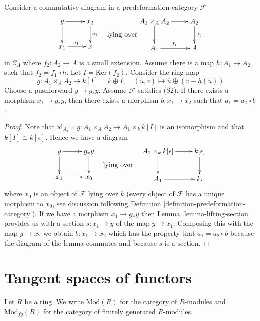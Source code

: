 \begin{lemma}
\label{lemma-lifting-along-small-extension}
Consider a commutative diagram in a predeformation category $\mathcal{F}$
$$
\vcenter{
\xymatrix{
y \ar[r] \ar[d] & x_2 \ar[d]^{a_2} \\
x_1 \ar[r]^{a_1}        & x
}
}
\quad\text{lying over}
\vcenter{
\xymatrix{
A_1 \times_A A_2 \ar[r] \ar[d] & A_2 \ar[d]^{f_2} \\
A_1 \ar[r]^{f_1} & A
}
}
$$
in $\mathcal{C}_\Lambda$ where
$f_2 : A_2 \to A$ is a small extension.
Assume there is a map $h : A_1 \to A_2$ such that $f_2 = f_1 \circ h$.
Let $I = \text{Ker}(f_2)$. Consider the ring map
$$
g : A_1 \times_A A_2 \longrightarrow k[I] = k \oplus I,\quad
(u, v) \longmapsto \overline{u} \oplus (v - h(u))
$$
Choose a pushforward $y \to g_*y$. Assume $\mathcal{F}$ satisfies (S2).
If there exists a morphism $x_1 \to g_*y$, then there exists a
morphism $b: x_1 \to x_2$ such that $a_1 =  a_2 \circ b$.
\end{lemma}

\begin{proof}
Note that
$\text{id}_{A_1} \times g : A_1 \times_A A_2 \to A_1 \times_k k[I]$
is an isomorphism and that $k[I] \cong k[\epsilon]$. Hence we have a diagram
$$
\vcenter{
\xymatrix{
y \ar[r] \ar[d] & g_*y \ar[d] \\
x_1 \ar[r]        & x_0
}
}
\quad\text{lying over}\quad
\vcenter{
\xymatrix{
A_1 \times_k k[\epsilon] \ar[r] \ar[d] & k[\epsilon] \ar[d] \\
A_1 \ar[r] & k.
}
}
$$
where $x_0$ is an object of $\mathcal{F}$ lying over $k$ (every object
of $\mathcal{F}$ has a unique morphism to $x_0$, see
discussion following Definition \ref{definition-predeformation-category}).
If we have a morphism $x_1 \to g_*y$ then
Lemma \ref{lemma-lifting-section}
provides us with a section $s : x_1 \to y$ of the map $y \to x_1$.
Composing this with the map $y \to x_2$ we obtain $b : x_1 \to x_2$
which has the property that $a_1 =  a_2 \circ b$ because
the diagram of the lemma commutes and because $s$ is a section.
\end{proof}





\section{Tangent spaces of functors}
\label{section-tangent-spaces-functors}

\noindent
Let $R$ be a ring. We write $\text{Mod}(R)$ for the category of 
$R$-modules and $\text{Mod}_{fg}(R)$ for the category of finitely 
generated $R$-modules.


